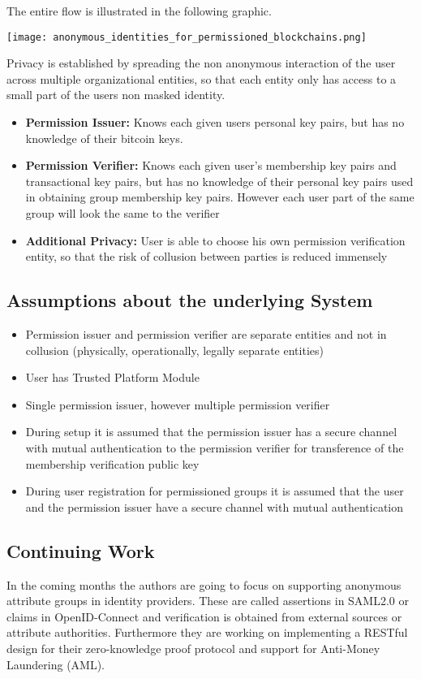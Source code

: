 The entire flow is illustrated in the following graphic.

 \texttt{[image: anonymous\_identities\_for\_permissioned\_blockchains.png]}

Privacy is established by spreading the non anonymous interaction of the user across multiple organizational entities, so that each entity only has access to a small part of the users non masked identity.\cite[p.4-5]{hardjono2016anonymous}
\begin{itemize}
\item \textbf{Permission Issuer:}
Knows each given users personal key pairs, but has no knowledge of their bitcoin keys.
\item \textbf{Permission Verifier:}
Knows each given user's membership key pairs and transactional key pairs, but has no knowledge of their personal key pairs used in obtaining group membership key pairs. However each user part of the same group will look the same to the verifier
\item \textbf{Additional Privacy:}
User is able to choose his own permission verification entity, so that the risk of collusion between parties is reduced immensely
\end{itemize}

\subsection{Assumptions about the underlying System}
\begin{itemize}
\item Permission issuer and permission verifier are separate entities and not in collusion (physically, operationally, legally separate entities)\cite[p.4]{hardjono2016anonymous}
\item User has Trusted Platform Module\cite[p.2-3]{hardjono2016anonymous}
\item Single permission issuer, however multiple permission verifier\cite[p.5]{hardjono2016anonymous}
\item During setup it is assumed that the permission issuer has a secure channel with mutual authentication to the permission verifier for transference of the membership verification public key\cite[p.5]{hardjono2016anonymous}
\item During user registration for permissioned groups it is assumed that the user and the permission issuer have a secure channel with mutual authentication\cite[p.6]{hardjono2016anonymous}
\end{itemize}

\subsection{Continuing Work}
In the coming months the authors are going to focus on supporting anonymous attribute groups in identity providers. These are called assertions in SAML2.0 or claims in OpenID-Connect and verification is obtained from external sources or attribute authorities. Furthermore they are working on implementing a RESTful design for their zero-knowledge proof protocol and support for Anti-Money Laundering (AML).\cite[p.17]{hardjono2016anonymous}


